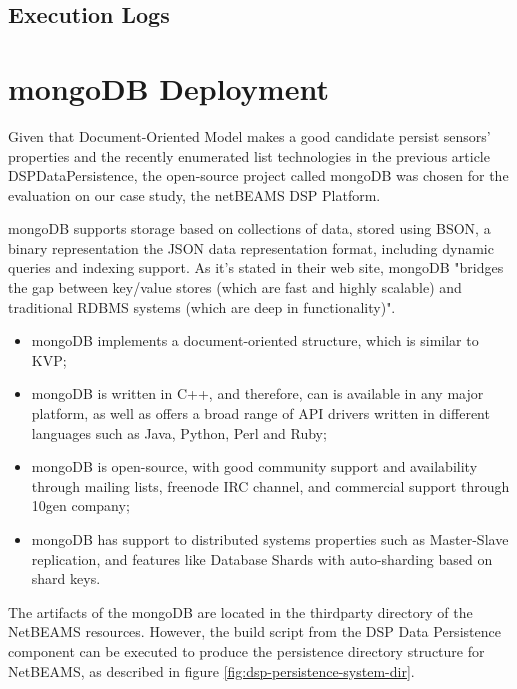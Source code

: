 \subsection{Execution Logs}

\section{mongoDB Deployment}

Given that Document-Oriented Model makes a good candidate persist sensors'
properties and the recently enumerated list technologies in the previous
article DSPDataPersistence, the open-source project called mongoDB was chosen
for the evaluation on our case study, the netBEAMS DSP Platform.

mongoDB supports storage based on collections of data, stored using BSON, a
binary representation the JSON data representation format, including dynamic
queries and indexing support. As it's stated in their web site, mongoDB
"bridges the gap between key/value stores (which are fast and highly scalable)
and traditional RDBMS systems (which are deep in functionality)".

\begin{itemize}
  \item mongoDB implements a document-oriented structure, which is similar to
  KVP;
  \item mongoDB is written in C++, and therefore, can is available in any major
  platform, as well as offers a broad range of API drivers written in different
  languages such as Java, Python, Perl and Ruby; 
  \item mongoDB is open-source, with good community support and availability
  through mailing lists, freenode IRC channel, and commercial support through
  10gen company; 
  \item mongoDB has support to distributed systems properties such as
  Master-Slave replication, and features like Database Shards with
  auto-sharding based on shard keys.
\end{itemize}

The artifacts of the mongoDB are located in the thirdparty directory of the
NetBEAMS resources. However, the build script from the DSP Data Persistence
component can be executed to produce the persistence directory
structure for NetBEAMS, as described in figure
\ref{fig:dsp-persistence-system-dir}.

